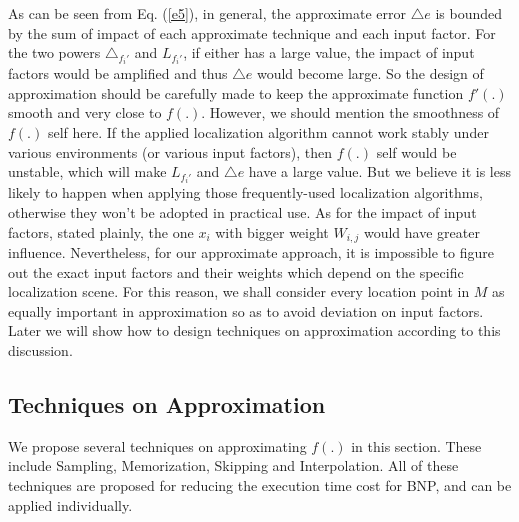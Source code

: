 \documentclass[10pt, conference, letterpaper]{IEEEtran}
\begin{document}
As can be seen from Eq. (\ref{e5}), in general, the approximate error $\triangle e$ is bounded by the sum of impact of each approximate technique and each input factor. For the two powers $\triangle_{f_i'}$ and $L_{f_i'}$, if either has a large value, the impact of input factors would be amplified and thus $\triangle e$ would become large. So the design of approximation should be carefully made to keep the approximate function $f'(.)$ smooth and very close to $f(.)$. However, we should mention the smoothness of $f(.)$ self here. If the applied localization algorithm cannot work stably under various environments (or various input factors), then $f(.)$ self would be unstable, which will make $L_{f_i'}$ and $\triangle e$ have a large value. But we believe it is less likely to happen when applying those frequently-used localization algorithms, otherwise they won't be adopted in practical use. As for the impact of input factors, stated plainly, the one $x_i$ with bigger weight $W_{i,j}$ would have greater influence. Nevertheless, for our approximate approach, it is impossible to figure out the exact input factors and their weights which depend on the specific localization scene. For this reason, we shall consider every location point in $M$ as equally important in approximation so as to avoid deviation on input factors. Later we will show how to design techniques on approximation according to this discussion.

\subsection{Techniques on Approximation} \label{technique}
We propose several techniques on approximating $f(.)$ in this section. These include Sampling, Memorization, Skipping and Interpolation. All of these techniques are proposed for reducing the execution time cost for BNP, and can be applied individually.
\end{document}
